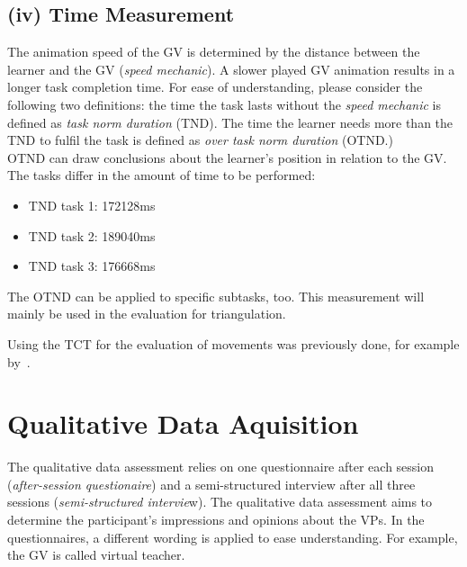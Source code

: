 \subsection{(iv) Time Measurement}
The animation speed of the GV is determined by the distance between the learner and the GV (\textit{speed mechanic}). A slower played GV animation results in a longer task completion time. For ease of understanding, please consider the following two definitions: the time the task lasts without the \textit{speed mechanic} is defined as \textit{task norm duration} (TND). The time the learner needs more than the TND to fulfil the task is defined as \textit{over task norm duration} (OTND.)\\
OTND can draw conclusions about the learner's position in relation to the GV.
The tasks differ in the amount of time to be performed:
\begin{itemize}
	\item TND task 1: 172128ms
	\item TND task 2: 189040ms
	\item TND task 3: 176668ms
\end{itemize}
The OTND can be applied to specific subtasks, too. This measurement will mainly be used in the evaluation for triangulation.

Using the TCT for the evaluation of movements was previously done, for example by~\cite{onebody,YouMove,perspectivematters}.

\section{Qualitative Data Aquisition}
\label{sec:quali_logging}
The qualitative data assessment relies on one questionnaire after each session (\textit{after-session questionaire}) and a semi-structured interview after all three sessions (\textit{semi-structured intervie}w). The qualitative data assessment aims to determine the participant's impressions and opinions about the VPs. In the questionnaires, a different wording is applied to ease understanding. For example, the GV is called virtual teacher. 

